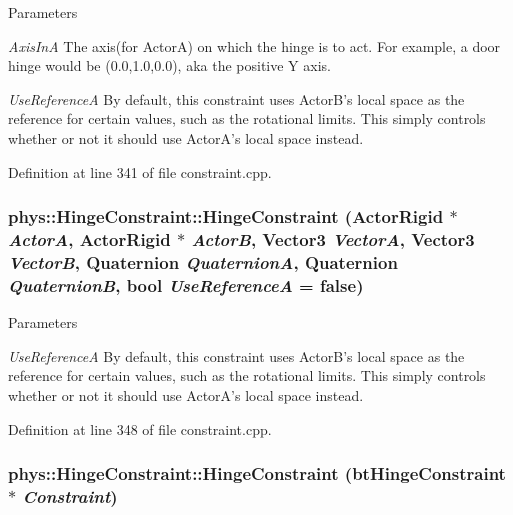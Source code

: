 \begin{DoxyParams}{Parameters}
\item[{\em AxisInA}]The axis(for ActorA) on which the hinge is to act. For example, a door hinge would be (0.0,1.0,0.0), aka the positive Y axis. \item[{\em UseReferenceA}]By default, this constraint uses ActorB's local space as the reference for certain values, such as the rotational limits. This simply controls whether or not it should use ActorA's local space instead. \end{DoxyParams}


Definition at line 341 of file constraint.cpp.

\hypertarget{classphys_1_1HingeConstraint_acf99af18e95c5b42119d91aff8a02a2a}{
\subsubsection[{HingeConstraint}]{\setlength{\rightskip}{0pt plus 5cm}phys::HingeConstraint::HingeConstraint ({\bf ActorRigid} $\ast$ {\em ActorA}, \/  {\bf ActorRigid} $\ast$ {\em ActorB}, \/  {\bf Vector3} {\em VectorA}, \/  {\bf Vector3} {\em VectorB}, \/  {\bf Quaternion} {\em QuaternionA}, \/  {\bf Quaternion} {\em QuaternionB}, \/  bool {\em UseReferenceA} = {\ttfamily false})}}
\label{d3/d0d/classphys_1_1HingeConstraint_acf99af18e95c5b42119d91aff8a02a2a}

\begin{DoxyParams}{Parameters}
\item[{\em UseReferenceA}]By default, this constraint uses ActorB's local space as the reference for certain values, such as the rotational limits. This simply controls whether or not it should use ActorA's local space instead. \end{DoxyParams}


Definition at line 348 of file constraint.cpp.

\hypertarget{classphys_1_1HingeConstraint_ab326e7128413aa3b737b726b3513c8df}{
\subsubsection[{HingeConstraint}]{\setlength{\rightskip}{0pt plus 5cm}phys::HingeConstraint::HingeConstraint (btHingeConstraint $\ast$ {\em Constraint})}}
\label{d3/d0d/classphys_1_1HingeConstraint_ab326e7128413aa3b737b726b3513c8df}


